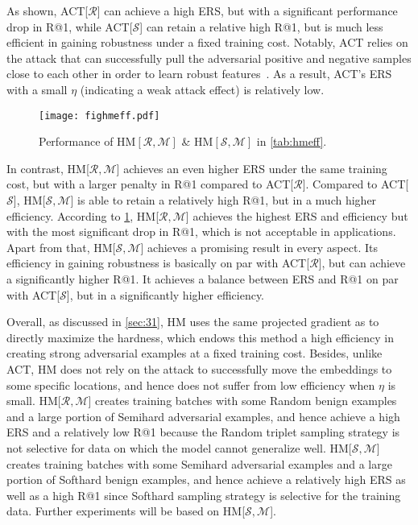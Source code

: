 \documentclass[10pt,twocolumn,letterpaper]{article}
\begin{document}

As shown, ACT[$\mathcal{R}$] can achieve a high ERS, but with a significant
performance drop in R@1, while ACT[$\mathcal{S}$] can retain a relative high
R@1, but is much less efficient in gaining robustness under a fixed training
cost.
%
Notably, ACT relies on the attack that can successfully pull the adversarial
positive and negative samples close to each other in order to learn robust
features~\cite{robrank}.
%
As a result, ACT's ERS with a small $\eta$ (indicating a weak attack effect) is
relatively low.

\begin{figure}[t]
	\texttt{[image: fighmeff.pdf]}
	\vspace{-1.5em}
	\caption{Performance of $\text{HM}[\mathcal{R},\mathcal{M}]$
	\& $\text{HM}[\mathcal{S},\mathcal{M}]$ in \cref{tab:hmeff}.
%
	}
	\label{fig:hmeff}
\end{figure}


In contrast, HM[$\mathcal{R},\mathcal{M}$] achieves an even higher ERS under
the same training cost, but with a larger penalty in R@1 compared to
ACT[$\mathcal{R}$].
%
Compared to ACT[$\mathcal{S}$], HM[$\mathcal{S},\mathcal{M}$] is able to retain
a relatively high R@1, but in a much higher efficiency.
%
According to \cref{fig:hmeff}, HM[$\mathcal{R},\mathcal{M}$] achieves the
highest ERS and efficiency but with the most significant drop in R@1, which is
not acceptable in applications.
%
Apart from that, HM[$\mathcal{S},\mathcal{M}$] achieves a promising result
in every aspect.
%
Its efficiency in gaining robustness is basically on par with
ACT[$\mathcal{R}$], but can achieve a significantly higher R@1.
%
It achieves a balance between ERS and R@1 on par with ACT[$\mathcal{S}$], but
in a significantly higher efficiency.





Overall, as discussed in \cref{sec:31}, HM uses the same projected gradient as
to directly maximize the hardness, which endows this method a high efficiency
in creating strong adversarial examples at a fixed training cost.
%
Besides, unlike ACT, HM does not rely on the attack to successfully move the
embeddings to some specific locations, and hence does not suffer from low
efficiency when $\eta$ is small.
%
HM[$\mathcal{R},\mathcal{M}$] creates training batches with some Random benign
examples and a large portion of Semihard adversarial examples, and hence
achieve a high ERS and a relatively low R@1 because the Random triplet sampling
strategy is not selective for data on which the model cannot generalize well.
%
HM[$\mathcal{S},\mathcal{M}$] creates training batches with some Semihard
adversarial examples and a large portion of Softhard benign examples, and hence
achieve a relatively high ERS as well as a high R@1 since Softhard sampling
strategy is selective for the training data.
%
Further experiments will be based on HM[$\mathcal{S},\mathcal{M}$].
\end{document}

